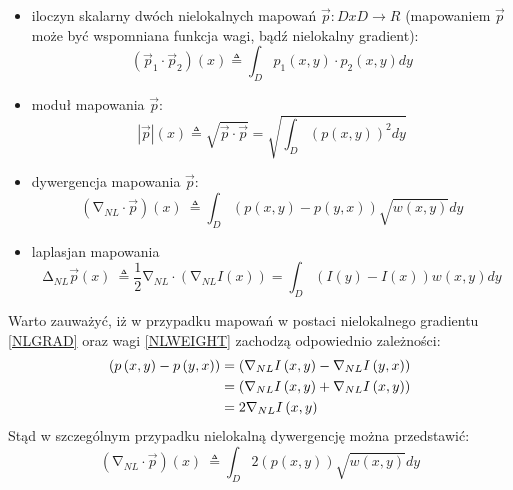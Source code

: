 \documentclass[12pt, twoside, openany]{report}
\theoremstyle{definition}
\begin{document}
\begin{itemize}
\item
iloczyn skalarny dwóch nielokalnych mapowań $\overrightarrow{p}:DxD\longrightarrow R$ (mapowaniem $\overrightarrow{p}$ może być wspomniana funkcja wagi, bądź nielokalny gradient):
\begin{equation}
\left({\overrightarrow{p}}_1\cdot {\overrightarrow{p}}_2\right)(x)\triangleq \int_D{p_1(x,y)\cdot p_2\left(x,y\right)dy}
\label{NLPRODUCT}
\end{equation}
\item
moduł mapowania $\overrightarrow{p}$:
\begin{equation}
\left|\overrightarrow{p}\right|\left(x\right)\triangleq \sqrt{\overrightarrow{p}\cdot \overrightarrow{p}}=\sqrt{\int_D{{\left(p\left(x,y\right)\right)}^2dy}} 
\label{NLMOD}
\end{equation}
\item
dywergencja mapowania $\overrightarrow{p}$:
\begin{equation}
({\mathrm{\nabla }}_{NL}\cdot \overrightarrow{p})(x)\ \triangleq \int_D{\left(p\left(x,y\right)-p\left(y,x\right)\right)\sqrt{w(x,y)}dy}
\label{NLDIV}
\end{equation}
\item
laplasjan mapowania
\begin{equation}
{\mathrm{\Delta }}_{NL}\overrightarrow{p}(x)\ \triangleq \frac{1}{2}{\mathrm{\nabla }}_{NL}\cdot \left({\mathrm{\nabla }}_{NL}I\left(x\right)\right)=\int_D{\left(I\left(y\right)-I\left(x\right)\right)w(x,y)dy}
\label{NLLAP}
\end{equation}
\end{itemize}
Warto zauważyć, iż w przypadku mapowań w postaci nielokalnego gradientu \eqref{NLGRAD} oraz wagi \eqref{NLWEIGHT} zachodzą odpowiednio zależności:
\begin{align}
\left(p\left(x,y\right)-p\left(y,x\right)\right) &= \left({\mathrm{\nabla }}_{NL}I\left(x,y\right)-{\mathrm{\nabla }}_{NL}I\left(y,x\right)\right)  \notag \\ 
&= \left({\mathrm{\nabla }}_{NL}I\left(x,y\right)+{\mathrm{\nabla }}_{NL}I\left(x,y\right)\right) \notag \\
&=2{\mathrm{\nabla }}_{NL}I\left(x,y\right)\
\label{NLPOM}
\end{align}
Stąd w szczególnym przypadku nielokalną dywergencję można przedstawić: 
\begin{equation}
({\mathrm{\nabla }}_{NL}\cdot \overrightarrow{p})(x)\ \triangleq \int_D{2\left(p\left(x,y\right)\right)\sqrt{w(x,y)}dy}
\label{NLDIVSMART}
\end{equation}
\end{document}
